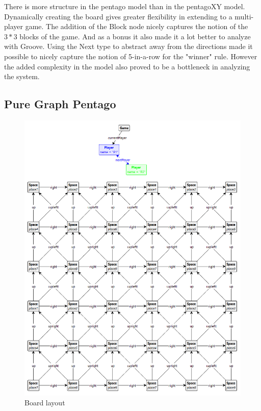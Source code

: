 \vspace{6pt}

There is more structure in the pentago model than in the pentagoXY model. Dynamically creating the board gives greater flexibility in extending to a multi-player game.
The addition of the Block node nicely captures the notion of the $3*3$ blocks of the game. And as a bonus it also made it a lot better to analyze with Groove.
Using the Next type to abstract away from the directions made it possible to nicely capture the notion of 5-in-a-row for the "winner" rule. However the added complexity in the model also proved to be a bottleneck in analyzing the system.

\subsection{Pure Graph Pentago}

\begin{figure}[!h]
    \centering
    \includegraphics[scale=0.35,clip]{Images/board1.png}
    \caption{Board layout}
    \label{fig:board1}
\end{figure}

